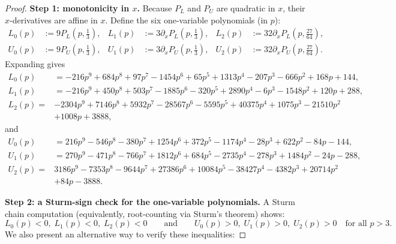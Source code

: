 \documentclass[11pt]{article}
\theoremstyle{definition}
\newcommand{\1}{\mathbf{1}}
\begin{document}
\begin{proof}
\smallskip
\noindent\textbf{Step 1: monotonicity in $x$.}
Because $P_L$ and $P_U$ are quadratic in $x$, their $x$-derivatives are affine in $x$.
Define the six one-variable polynomials (in $p$):
\begin{align*}
L_0(p)&:=9P_L\!\left(p,\frac13\right),&
L_1(p)&:=3\partial_x P_L\!\left(p,\frac13\right),&
L_2(p)&:=32\partial_x P_L\!\left(p,\frac{27}{64}\right),\\
U_0(p)&:=9P_U\!\left(p,\frac13\right),&
U_1(p)&:=3\partial_x P_U\!\left(p,\frac13\right),&
U_2(p)&:=32\partial_x P_U\!\left(p,\frac{27}{64}\right).
\end{align*}
Expanding gives
\begin{align*}
L_0(p)&=-216 p^9 + 684 p^8 + 97 p^7 -1454 p^6 +65 p^5 +1313 p^4 -207 p^3 -666 p^2 +168 p +144,\\
L_1(p)&=-216 p^9 +450 p^8 +503 p^7 -1885 p^6 -320 p^5 +2890 p^4 -6 p^3 -1548 p^2 +120 p +288,\\
L_2(p)=&-2304 p^9 +7146 p^8 +5932 p^7 -28567 p^6 -5595 p^5 +40375 p^4 +1075 p^3 -21510 p^2\\& +1008 p +3888,
\end{align*}
and
\begin{align*}
U_0(p)&=216 p^9 -546 p^8 -380 p^7 +1254 p^6 +372 p^5 -1174 p^4 -28 p^3 +622 p^2 -84 p -144,\\
U_1(p)&=270 p^9 -471 p^8 -766 p^7 +1812 p^6 +684 p^5 -2735 p^4 -278 p^3 +1484 p^2 -24 p -288,\\
U_2(p)=&3186 p^9 -7353 p^8 -9644 p^7 +27386 p^6 +10084 p^5 -38427 p^4 -4382 p^3 +20714 p^2\\&+84 p -3888.
\end{align*}

\smallskip
\noindent\textbf{Step 2: a Sturm-sign check for the one-variable polynomials.}
A Sturm chain computation (equivalently, root-counting via Sturm's theorem) shows:
\[
L_0(p)<0,\; L_1(p)<0,\; L_2(p)<0
\qquad\text{and}\qquad
U_0(p)>0,\; U_1(p)>0,\; U_2(p)>0
\quad\text{for all }p>3.
\tag{$\dagger$}
\]
We also present an alternative way to verify these inequalities: 


\end{proof}
\end{document}
